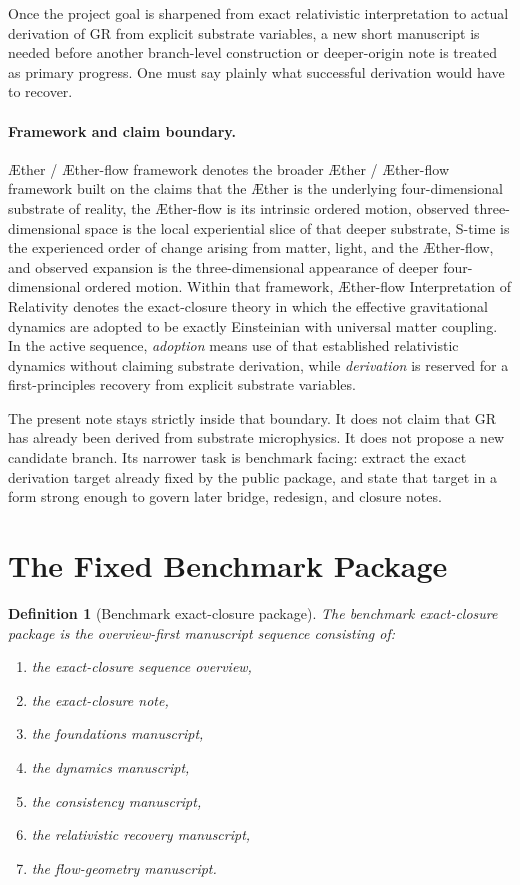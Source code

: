 \documentclass[11pt]{article}
\newcommand{\Aether}{\AE{}ther}
\newcommand{\Aflow}{\AE{}ther-flow}
\newcommand{\TheoryName}{\Aflow{} Interpretation of Relativity}
\newcommand{\TheoryProgram}{\Aether{} / \Aflow{} framework}
\newtheorem{definition}{Definition}
\begin{document}
Once the project goal is sharpened from exact relativistic interpretation to actual derivation of GR from explicit substrate variables, a new short manuscript is needed before another branch-level construction or deeper-origin note is treated as primary progress. One must say plainly what successful derivation would have to recover.

\paragraph{Framework and claim boundary.}
\TheoryProgram{} denotes the broader \Aether{} / \Aflow{} framework built on the claims that the \Aether{} is the underlying four-dimensional substrate of reality, the \Aflow{} is its intrinsic ordered motion, observed three-dimensional space is the local experiential slice of that deeper substrate, S-time is the experienced order of change arising from matter, light, and the \Aflow{}, and observed expansion is the three-dimensional appearance of deeper four-dimensional ordered motion. Within that framework, \TheoryName{} denotes the exact-closure theory in which the effective gravitational dynamics are adopted to be exactly Einsteinian with universal matter coupling. In the active sequence, \emph{adoption} means use of that established relativistic dynamics without claiming substrate derivation, while \emph{derivation} is reserved for a first-principles recovery from explicit substrate variables.

The present note stays strictly inside that boundary. It does not claim that GR has already been derived from substrate microphysics. It does not propose a new candidate branch. Its narrower task is benchmark facing: extract the exact derivation target already fixed by the public package, and state that target in a form strong enough to govern later bridge, redesign, and closure notes.

\section{The Fixed Benchmark Package}

\begin{definition}[Benchmark exact-closure package]
The \emph{benchmark exact-closure package} is the overview-first manuscript sequence consisting of:
\begin{enumerate}
    \item the exact-closure sequence overview,
    \item the exact-closure note,
    \item the foundations manuscript,
    \item the dynamics manuscript,
    \item the consistency manuscript,
    \item the relativistic recovery manuscript,
    \item the flow-geometry manuscript.
\end{enumerate}
\end{definition}
\end{document}
